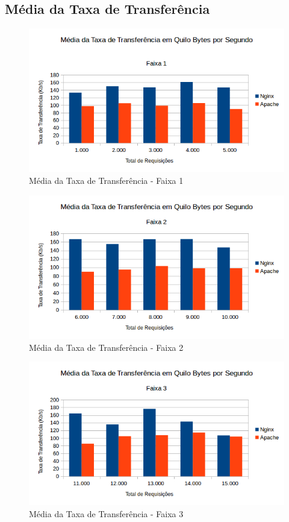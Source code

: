 \subsection{Média da Taxa de Transferência}
\begin{figure}[H]
	\centering
	\includegraphics[width=1\linewidth]{graficos/grafico6-f1} 
	\caption{Média da Taxa de Transferência - Faixa 1}
	\label{fig:grafico6-f1}
\end{figure}

\begin{figure}[H]
	\centering
	\includegraphics[width=1\linewidth]{graficos/grafico6-f2} 
	\caption{Média da Taxa de Transferência - Faixa 2}
	\label{fig:grafico6-f2}
\end{figure}

\begin{figure}[H]
	\centering
	\includegraphics[width=1\linewidth]{graficos/grafico6-f3} 
	\caption{Média da Taxa de Transferência - Faixa 3}
	\label{fig:grafico6-f3}
\end{figure}

